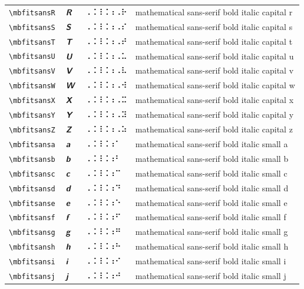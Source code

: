\documentclass[oneside]{article}
\begin{document}
\begin{longtable}{llll}
\verb|\mbfitsansR| & $\mbfitsansR$ &  ⠠⠨⠸⠨⠰⠠⠗  & {mathematical sans-serif bold italic capital r} \\[2ex]
\verb|\mbfitsansS| & $\mbfitsansS$ &  ⠠⠨⠸⠨⠰⠠⠎  & {mathematical sans-serif bold italic capital s} \\[2ex]
\verb|\mbfitsansT| & $\mbfitsansT$ &  ⠠⠨⠸⠨⠰⠠⠞  & {mathematical sans-serif bold italic capital t} \\[2ex]
\verb|\mbfitsansU| & $\mbfitsansU$ &  ⠠⠨⠸⠨⠰⠠⠥  & {mathematical sans-serif bold italic capital u} \\[2ex]
\verb|\mbfitsansV| & $\mbfitsansV$ &  ⠠⠨⠸⠨⠰⠠⠧  & {mathematical sans-serif bold italic capital v} \\[2ex]
\verb|\mbfitsansW| & $\mbfitsansW$ &  ⠠⠨⠸⠨⠰⠠⠺  & {mathematical sans-serif bold italic capital w} \\[2ex]
\verb|\mbfitsansX| & $\mbfitsansX$ &  ⠠⠨⠸⠨⠰⠠⠭  & {mathematical sans-serif bold italic capital x} \\[2ex]
\verb|\mbfitsansY| & $\mbfitsansY$ &  ⠠⠨⠸⠨⠰⠠⠽  & {mathematical sans-serif bold italic capital y} \\[2ex]
\verb|\mbfitsansZ| & $\mbfitsansZ$ &  ⠠⠨⠸⠨⠰⠠⠵  & {mathematical sans-serif bold italic capital z} \\[2ex]
\verb|\mbfitsansa| & $\mbfitsansa$ &  ⠠⠨⠸⠨⠰⠁  & {mathematical sans-serif bold italic small a} \\[2ex]
\verb|\mbfitsansb| & $\mbfitsansb$ &  ⠠⠨⠸⠨⠰⠃  & {mathematical sans-serif bold italic small b} \\[2ex]
\verb|\mbfitsansc| & $\mbfitsansc$ &  ⠠⠨⠸⠨⠰⠉  & {mathematical sans-serif bold italic small c} \\[2ex]
\verb|\mbfitsansd| & $\mbfitsansd$ &  ⠠⠨⠸⠨⠰⠙  & {mathematical sans-serif bold italic small d} \\[2ex]
\verb|\mbfitsanse| & $\mbfitsanse$ &  ⠠⠨⠸⠨⠰⠑  & {mathematical sans-serif bold italic small e} \\[2ex]
\verb|\mbfitsansf| & $\mbfitsansf$ &  ⠠⠨⠸⠨⠰⠋  & {mathematical sans-serif bold italic small f} \\[2ex]
\verb|\mbfitsansg| & $\mbfitsansg$ &  ⠠⠨⠸⠨⠰⠛  & {mathematical sans-serif bold italic small g} \\[2ex]
\verb|\mbfitsansh| & $\mbfitsansh$ &  ⠠⠨⠸⠨⠰⠓  & {mathematical sans-serif bold italic small h} \\[2ex]
\verb|\mbfitsansi| & $\mbfitsansi$ &  ⠠⠨⠸⠨⠰⠊  & {mathematical sans-serif bold italic small i} \\[2ex]
\verb|\mbfitsansj| & $\mbfitsansj$ &  ⠠⠨⠸⠨⠰⠚  & {mathematical sans-serif bold italic small j} \\[2ex]

\end{longtable}
\end{document}
